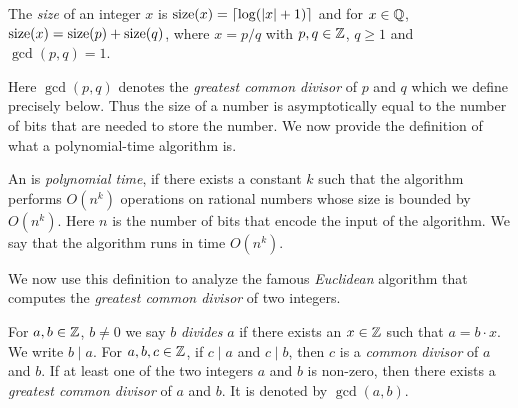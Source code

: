 \begin{definition}
  \label{def:2}
  The \emph{size} of an integer $x$
  is $\operatorname{size}(x) = \lceil\log( |x| +1)\rceil$
  and for $x \in \mathbb{Q}$,
  $\operatorname{size}(x) = \operatorname{size}(p)+\operatorname{size}(q)$,
  where $x = p/q$ with $p,q \in \mathbb{Z}$, $q\geq1$ and $\gcd(p,q)=1$.   
\end{definition}
Here $\gcd(p,q)$ denotes the \emph{greatest common divisor} of $p$ and $q$ which we define precisely below. 
Thus the size of a number is asymptotically equal to the number of
bits that are needed to store the number.  We now provide the
definition of what a polynomial-time algorithm is.
\begin{definition}
  \label{def:1}
  An  is \emph{polynomial time}, if there exists a
  constant $k$
  such that the algorithm performs $O(n^k)$
  operations on rational numbers whose size is bounded by
  $O(n^k)$.
  Here $n$
  is the number of bits that encode the input of the algorithm. We say that the algorithm runs in time $O(n^k)$. 
\end{definition}

We now use this definition to analyze the famous \emph{Euclidean} algorithm that computes the \emph{greatest common divisor} of two integers. 

 For $a,b \in \mathbb{Z}$, $b \neq0$ we say $b$ \emph{divides} $a$ if there
    exists an $x \in \mathbb{Z}$ such that $a = b \cdot  x$. We 
    write    $b\mid a$.  
   For $a,b,c \in \mathbb{Z}$, if $c\mid a$ and $c\mid b$, then $c$ is a
    \emph{common divisor} of $a$ and $b$. 
    If at least one of the two integers $a$ and $b$ is non-zero,
    then there exists a \emph{greatest common divisor} of $a$ and
    $b$. It is denoted by \emph{$\gcd(a,b)$}. 
    


